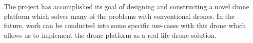 \documentclass[12pt]{article}
\begin{document}
The project has accomplished its goal of designing and constructing a novel drone platform which solves many of the problems with conventional drones. In the future, work can be conducted into some specific use-cases with this drone which allows us to implement the drone platform as a real-life drone solution.

\newpage



\end{document}
